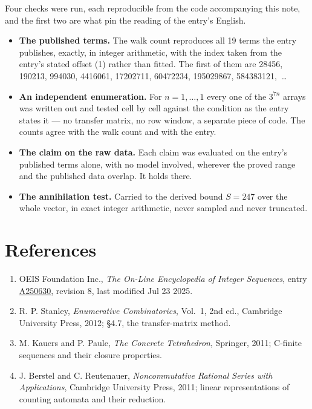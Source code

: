 \documentclass[11pt]{article}
\theoremstyle{definition}
\begin{document}
Four checks were run, each reproducible from the code accompanying this note, and the first two are what pin the reading of the entry's English.

\begin{itemize}

\item {\bfseries The published terms.} The walk count reproduces all 19 terms the entry publishes, exactly, in integer arithmetic, with the index taken from the entry's stated offset (1) rather than fitted. The first of them are 28456, 190213, 994030, 4416061, 17202711, 60472234, 195029867, 584383121,~\dots

\item {\bfseries An independent enumeration.} For $n = 1,\dots,1$ every one of the $3^{7n}$ arrays was written out and tested cell by cell against the condition as the entry states it --- no transfer matrix, no row window, a separate piece of code. The counts agree with the walk count and with the entry.

\item {\bfseries The claim on the raw data.} Each claim was evaluated on the entry's published terms alone, with no model involved, wherever the proved range and the published data overlap. It holds there.

\item {\bfseries The annihilation test.} Carried to the derived bound $S = 247$ over the whole vector, in exact integer arithmetic, never sampled and never truncated.

\end{itemize}

\section{References}

\begin{enumerate}

\item OEIS Foundation Inc., \emph{The On-Line Encyclopedia of Integer Sequences}, entry \href{https://oeis.org/A250630}{A250630}, revision 8, last modified Jul 23 2025.

\item R. P. Stanley, \emph{Enumerative Combinatorics}, Vol.~1, 2nd ed., Cambridge University Press, 2012; \S4.7, the transfer-matrix method.

\item M. Kauers and P. Paule, \emph{The Concrete Tetrahedron}, Springer, 2011; C-finite sequences and their closure properties.

\item J. Berstel and C. Reutenauer, \emph{Noncommutative Rational Series with Applications}, Cambridge University Press, 2011; linear representations of counting automata and their reduction.

\end{enumerate}
\end{document}
